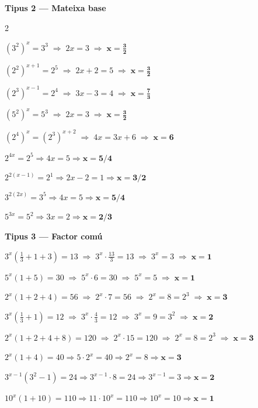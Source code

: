 \documentclass[12pt,a4paper]{article}
\begin{document}
\vspace{0.3cm}

\noindent\textbf{Tipus 2 --- Mateixa base}

\begin{multicols}{2}
\begin{exercicis}
    \item $(3^2)^x = 3^3 \;\Rightarrow\; 2x=3 \;\Rightarrow\; \boldsymbol{x=\tfrac{3}{2}}$
    \item $(2^2)^{x+1} = 2^5 \;\Rightarrow\; 2x+2=5 \;\Rightarrow\; \boldsymbol{x=\tfrac{3}{2}}$
    \item $(2^3)^{x-1} = 2^4 \;\Rightarrow\; 3x-3=4 \;\Rightarrow\; \boldsymbol{x=\tfrac{7}{3}}$
    \item $(5^2)^x = 5^3 \;\Rightarrow\; 2x=3 \;\Rightarrow\; \boldsymbol{x=\tfrac{3}{2}}$
    \item $(2^4)^x = (2^3)^{x+2} \;\Rightarrow\; 4x=3x+6 \;\Rightarrow\; \boldsymbol{x=6}$
    \item $2^{4x} = 2^5 \Rightarrow 4x=5 \Rightarrow \boldsymbol{x=5/4}$
    \item $2^{2(x-1)} = 2^1 \Rightarrow 2x-2=1 \Rightarrow \boldsymbol{x=3/2}$
    \item $3^{2(2x)} = 3^5 \Rightarrow 4x=5 \Rightarrow \boldsymbol{x=5/4}$
    \item $5^{3x} = 5^2 \Rightarrow 3x=2 \Rightarrow \boldsymbol{x=2/3}$
\end{exercicis}
\end{multicols}

\vspace{0.3cm}

\noindent\textbf{Tipus 3 --- Factor comú}

\begin{exercicis}
    \item $3^x\!\left(\tfrac{1}{3}+1+3\right)=13 \;\Rightarrow\; 3^x \cdot \tfrac{13}{3}=13 \;\Rightarrow\; 3^x=3 \;\Rightarrow\; \boldsymbol{x=1}$
    \item $5^x(1+5)=30 \;\Rightarrow\; 5^x \cdot 6=30 \;\Rightarrow\; 5^x=5 \;\Rightarrow\; \boldsymbol{x=1}$
    \item $2^x(1+2+4)=56 \;\Rightarrow\; 2^x \cdot 7=56 \;\Rightarrow\; 2^x=8=2^3 \;\Rightarrow\; \boldsymbol{x=3}$
    \item $3^x\!\left(\tfrac{1}{3}+1\right)=12 \;\Rightarrow\; 3^x \cdot \tfrac{4}{3}=12 \;\Rightarrow\; 3^x=9=3^2 \;\Rightarrow\; \boldsymbol{x=2}$
    \item $2^x(1+2+4+8)=120 \;\Rightarrow\; 2^x \cdot 15=120 \;\Rightarrow\; 2^x=8=2^3 \;\Rightarrow\; \boldsymbol{x=3}$
    \item $2^x(1+4)=40 \Rightarrow 5 \cdot 2^x = 40 \Rightarrow 2^x = 8 \Rightarrow \boldsymbol{x=3}$
    \item $3^{x-1}(3^2 - 1) = 24 \Rightarrow 3^{x-1} \cdot 8 = 24 \Rightarrow 3^{x-1} = 3 \Rightarrow \boldsymbol{x=2}$
    \item $10^x(1+10)=110 \Rightarrow 11 \cdot 10^x = 110 \Rightarrow 10^x = 10 \Rightarrow \boldsymbol{x=1}$

\end{exercicis}
\end{document}
